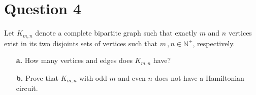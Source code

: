 \documentclass[11pt]{article}
\begin{document}
\section*{Question 4 \hfill {}}
Let $K_{m,n}$ denote a complete bipartite graph such that exactly $m$ and $n$ vertices exist in its two disjoints sets of vertices such that $m\,,n\in\mathbb{N}^+$, respectively.
\begin{itemize}
	\item[\textbf{a.}] How many vertices and edges does $K_{m,n}$ have? \hfill {}
	\item[\textbf{b.}] Prove that $K_{m,n}$ with odd $m$ and even $n$ does not have a Hamiltonian circuit. \hfill {}
\end{itemize}

\pagebreak
\end{document}
